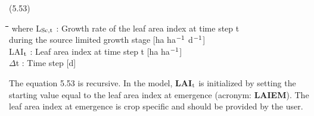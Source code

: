  
\strut\hfill (5.53)
\nwln
\begin{tabbing}
\hspace{1.27cm}\=\hspace{1.27cm}\=\hspace{1.27cm}\=\hspace{1.27cm}\=%
\hspace{1.27cm}\=\hspace{1.27cm}\=\hspace{1.27cm}\=\hspace{1.27cm}\=%
\hspace{1.27cm}\=\hspace{1.27cm}\=\kill
where L$_{{\rm Sc,t}}$ : Growth rate of the leaf area index at time step t\\
   during the source limited growth stage        [ha ha$^{{\rm -1}}$ d$^{{\rm -1}}$]\\
LAI$_{{\rm t}}$ : Leaf area index at time step t         [ha ha$^{{\rm -1}}$]\\
$\Delta$t : Time step        [d]
\end{tabbing}

 
The equation 5.53 is recursive. In the model, {\bf LAI$_{{\rm t}}$} is initialized by setting the starting
value equal to the leaf area index at emergence (acronym: {\bf LAIEM}). The leaf area index
at emergence is crop specific and should be provided by the user.



